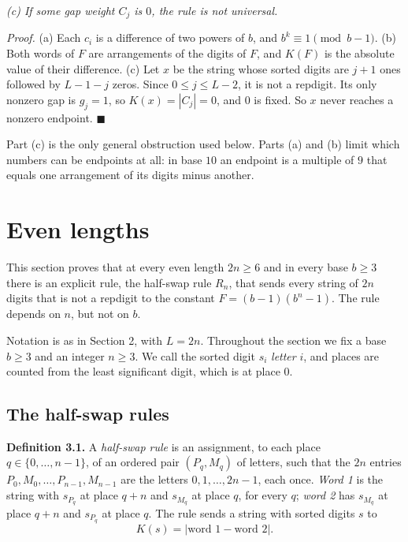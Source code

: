 \documentclass[11pt,letterpaper]{article}
\theoremstyle{paperstyle}
\theoremstyle{paperstyledef}
\theoremstyle{paperstylerem}
\begin{document}
\emph{(c) If some gap weight \(C_j\) is \(0\), the rule is not universal.}

\emph{Proof.} (a) Each \(c_i\) is a difference of two powers of \(b\), and \(b^k \equiv 1 \pmod{b-1}\). (b) Both words of \(F\) are arrangements of the digits of \(F\), and \(K(F)\) is the absolute value of their difference. (c) Let \(x\) be the string whose sorted digits are \(j+1\) ones followed by \(L-1-j\) zeros. Since \(0 \leq j \leq L-2\), it is not a repdigit. Its only nonzero gap is \(g_j = 1\), so \(K(x) = |C_j| = 0\), and \(0\) is fixed. So \(x\) never reaches a nonzero endpoint. \(\blacksquare\)

Part (c) is the only general obstruction used below. Parts (a) and (b) limit which numbers can be endpoints at all: in base \(10\) an endpoint is a multiple of \(9\) that equals one arrangement of its digits minus another.

\section{Even lengths}\label{even-lengths}

This section proves that at every even length \(2n \geq 6\) and in every base \(b \geq 3\) there is an explicit rule, the half-swap rule \(R_n\), that sends every string of \(2n\) digits that is not a repdigit to the constant \(F = (b-1)(b^n - 1)\). The rule depends on \(n\), but not on \(b\).

Notation is as in Section 2, with \(L = 2n\). Throughout the section we fix a base \(b \geq 3\) and an integer \(n \geq 3\). We call the sorted digit \(s_i\) \emph{letter} \(i\), and places are counted from the least significant digit, which is at place \(0\).

\subsection{The half-swap rules}\label{the-half-swap-rules}

\textbf{Definition 3.1.} A \emph{half-swap rule} is an assignment, to each place \(q \in \{0, \dots, n-1\}\), of an ordered pair \((P_q, M_q)\) of letters, such that the \(2n\) entries \(P_0, M_0, \dots, P_{n-1}, M_{n-1}\) are the letters \(0, 1, \dots, 2n-1\), each once. \emph{Word 1} is the string with \(s_{P_q}\) at place \(q + n\) and \(s_{M_q}\) at place \(q\), for every \(q\); \emph{word 2} has \(s_{M_q}\) at place \(q + n\) and \(s_{P_q}\) at place \(q\). The rule sends a string with sorted digits \(s\) to \[K(s) = \lvert \text{word 1} - \text{word 2} \rvert.\]
\end{document}
